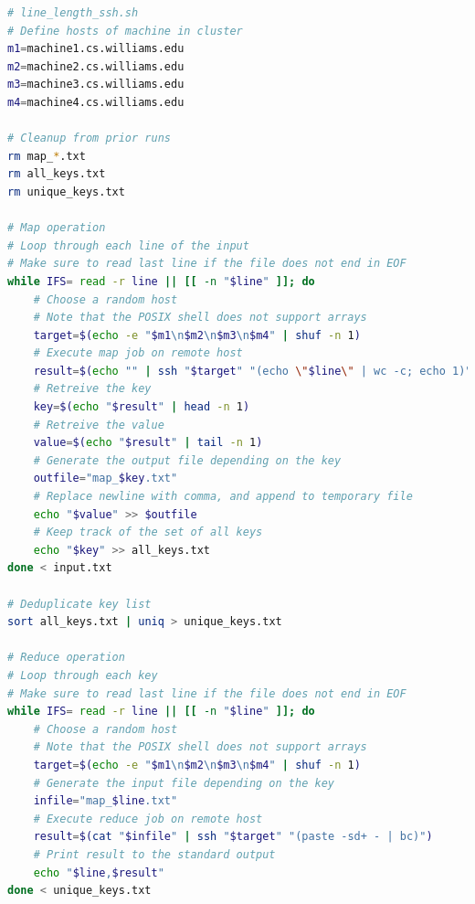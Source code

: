 \documentclass[twoside]{report}
\begin{document}
\begin{lstlisting}[language=sh]
# line_length_ssh.sh
# Define hosts of machine in cluster
m1=machine1.cs.williams.edu
m2=machine2.cs.williams.edu
m3=machine3.cs.williams.edu
m4=machine4.cs.williams.edu

# Cleanup from prior runs
rm map_*.txt
rm all_keys.txt
rm unique_keys.txt

# Map operation
# Loop through each line of the input
# Make sure to read last line if the file does not end in EOF
while IFS= read -r line || [[ -n "$line" ]]; do
    # Choose a random host
    # Note that the POSIX shell does not support arrays
    target=$(echo -e "$m1\n$m2\n$m3\n$m4" | shuf -n 1)
    # Execute map job on remote host
    result=$(echo "" | ssh "$target" "(echo \"$line\" | wc -c; echo 1)")
    # Retreive the key
    key=$(echo "$result" | head -n 1)
    # Retreive the value
    value=$(echo "$result" | tail -n 1)
    # Generate the output file depending on the key
    outfile="map_$key.txt"
    # Replace newline with comma, and append to temporary file
    echo "$value" >> $outfile
    # Keep track of the set of all keys
    echo "$key" >> all_keys.txt
done < input.txt

# Deduplicate key list
sort all_keys.txt | uniq > unique_keys.txt

# Reduce operation
# Loop through each key
# Make sure to read last line if the file does not end in EOF
while IFS= read -r line || [[ -n "$line" ]]; do
    # Choose a random host
    # Note that the POSIX shell does not support arrays
    target=$(echo -e "$m1\n$m2\n$m3\n$m4" | shuf -n 1)
    # Generate the input file depending on the key
    infile="map_$line.txt"
    # Execute reduce job on remote host
    result=$(cat "$infile" | ssh "$target" "(paste -sd+ - | bc)")
    # Print result to the standard output
    echo "$line,$result"
done < unique_keys.txt
\end{lstlisting}
\end{document}

